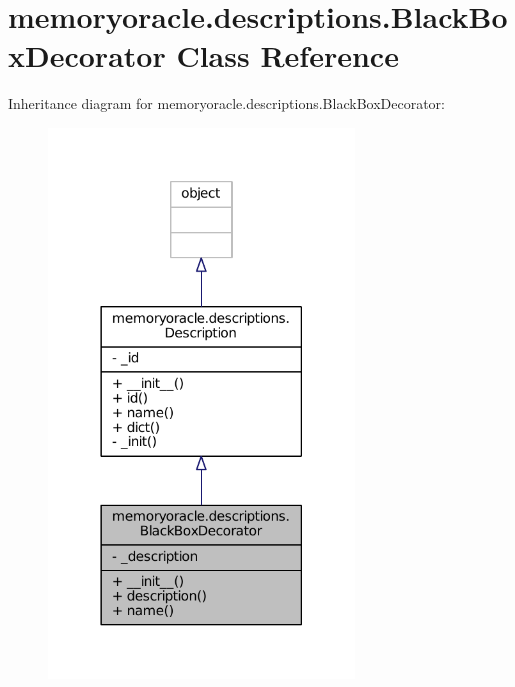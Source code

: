 \hypertarget{classmemoryoracle_1_1descriptions_1_1BlackBoxDecorator}{}\section{memoryoracle.\+descriptions.\+Black\+Box\+Decorator Class Reference}
\label{classmemoryoracle_1_1descriptions_1_1BlackBoxDecorator}


Inheritance diagram for memoryoracle.\+descriptions.\+Black\+Box\+Decorator\+:\nopagebreak
\begin{figure}[H]
\begin{center}
\leavevmode
\includegraphics[width=230pt]{classmemoryoracle_1_1descriptions_1_1BlackBoxDecorator__inherit__graph}
\end{center}
\end{figure}


